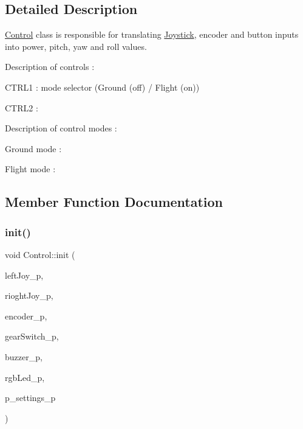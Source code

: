 \subsection{Detailed Description}
\hyperlink{class_control}{Control} class is responsible for translating \hyperlink{class_joystick}{Joystick}, encoder and button inputs into power, pitch, yaw and roll values. 


\begin{DoxyItemize}
\item Description of controls \+:
\begin{DoxyItemize}
\item C\+T\+R\+L1 \+: mode selector (Ground (off) / Flight (on))
\item C\+T\+R\+L2 \+:
\end{DoxyItemize}
\item Description of control modes \+:
\begin{DoxyItemize}
\item Ground mode \+:
\item Flight mode \+: 
\end{DoxyItemize}
\end{DoxyItemize}

\subsection{Member Function Documentation}
\mbox{\label{class_control_a435c342eba3a2598f3eb40e68fa1a263}} 
\subsubsection{\texorpdfstring{init()}{init()}}
{\footnotesize\ttfamily void Control\+::init (\begin{DoxyParamCaption}\item[{\hyperlink{class_joystick}{Joystick}}]{left\+Joy\+\_\+p,  }\item[{\hyperlink{class_joystick}{Joystick}}]{rioght\+Joy\+\_\+p,  }\item[{\hyperlink{class_encoder}{Encoder}}]{encoder\+\_\+p,  }\item[{\hyperlink{class_switch}{Switch}}]{gear\+Switch\+\_\+p,  }\item[{\hyperlink{class_buzzer}{Buzzer}}]{buzzer\+\_\+p,  }\item[{\hyperlink{class_r_g_b_led}{R\+G\+B\+Led}}]{rgb\+Led\+\_\+p,  }\item[{const \hyperlink{class_settings}{Settings} $\ast$}]{p\+\_\+settings\+\_\+p }\end{DoxyParamCaption})}



